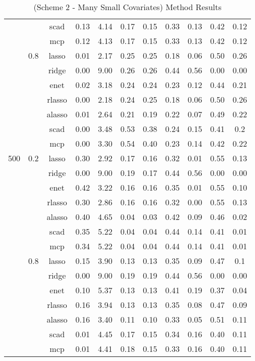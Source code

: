 \begin{table}[H]
{\begin{tabular}{c c c|c|c|c c|c c c c}
        & &scad &0.13 &4.14 &0.17 &0.15 &0.33 &0.13 &0.42 &0.12\\
        & &mcp &0.12 &4.13 &0.17 &0.15 &0.33 &0.13 &0.42 &0.12\\
        \cline{2-11}
        &0.8 &lasso &0.01 &2.17 &0.25 &0.25 &0.18 &0.06 &0.50 &0.26\\
        & &ridge &0.00 &9.00 &0.26 &0.26 &0.44 &0.56 &0.00&0.00\\
        & &enet &0.02 &3.18 &0.24 &0.24 &0.23 &0.12 &0.44 &0.21\\
        & &rlasso &0.00&2.18 &0.24 &0.25 &0.18 &0.06 &0.50 &0.26\\
        & &alasso &0.01 &2.64 &0.21 &0.19 &0.22 &0.07 &0.49 &0.22\\
        & &scad &0.00&3.48 &0.53 &0.38 &0.24 &0.15 &0.41 &0.2\\
        & &mcp &0.00&3.30 &0.54 &0.40&0.23 &0.14 &0.42 &0.22\\
        \hline
        500 &0.2 &lasso &0.30&2.92 &0.17 &0.16 &0.32 &0.01 &0.55 &0.13\\
        & &ridge &0.00 &9.00 &0.19 &0.17 &0.44 &0.56 &0.00&0.00\\
        & &enet &0.42 &3.22 &0.16 &0.16 &0.35 &0.01 &0.55 &0.10\\
        & &rlasso &0.30&2.86 &0.16 &0.16 &0.32 &0.00&0.55 &0.13\\
        & &alasso &0.40&4.65 &0.04 &0.03 &0.42 &0.09 &0.46 &0.02\\
        & &scad &0.35 &5.22 &0.04 &0.04 &0.44 &0.14 &0.41 &0.01\\
        & &mcp &0.34 &5.22 &0.04 &0.04 &0.44 &0.14 &0.41 &0.01\\
        \cline{2-11}
        &0.8 &lasso &0.15 &3.90 &0.13 &0.13 &0.35 &0.09 &0.47 &0.1\\
        & &ridge &0.00 &9.00 &0.19 &0.19 &0.44 &0.56 &0.00&0.00\\
        & &enet &0.10&5.37 &0.13 &0.13 &0.41 &0.19 &0.37 &0.04\\
        & &rlasso &0.16 &3.94 &0.13 &0.13 &0.35 &0.08 &0.47 &0.09\\
        & &alasso &0.16 &3.40 &0.11 &0.10&0.33 &0.05 &0.51 &0.11\\
        & &scad &0.01 &4.45 &0.17 &0.15 &0.34 &0.16 &0.40&0.11\\
        & &mcp &0.01 &4.41 &0.18 &0.15 &0.33 &0.16 &0.40&0.11\\
        \hline
    \end{tabular}
    }
    \caption{(Scheme 2 - Many Small Covariates) Method Results}
    \label{tbl:scheme-2-results}
\end{table}
